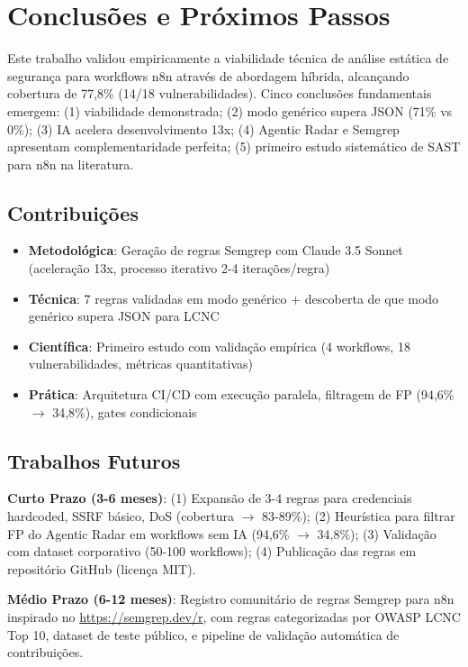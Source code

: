 \documentclass[12pt,a4paper]{article}
\begin{document}
\section{Conclusões e Próximos Passos}
\label{sec:conclusoes}

Este trabalho validou empiricamente a viabilidade técnica de análise estática de segurança para workflows n8n através de abordagem híbrida, alcançando cobertura de 77,8\% (14/18 vulnerabilidades). Cinco conclusões fundamentais emergem: (1) viabilidade demonstrada; (2) modo genérico supera JSON (71\% vs 0\%); (3) IA acelera desenvolvimento 13x; (4) Agentic Radar e Semgrep apresentam complementaridade perfeita; (5) primeiro estudo sistemático de SAST para n8n na literatura.

\subsection{Contribuições}

\begin{itemize}[noitemsep,topsep=0pt]
    \item \textbf{Metodológica}: Geração de regras Semgrep com Claude 3.5 Sonnet (aceleração 13x, processo iterativo 2-4 iterações/regra)
    \item \textbf{Técnica}: 7 regras validadas em modo genérico + descoberta de que modo genérico supera JSON para LCNC
    \item \textbf{Científica}: Primeiro estudo com validação empírica (4 workflows, 18 vulnerabilidades, métricas quantitativas)
    \item \textbf{Prática}: Arquitetura CI/CD com execução paralela, filtragem de FP (94,6\% $\rightarrow$ 34,8\%), gates condicionais
\end{itemize}

\subsection{Trabalhos Futuros}
\label{sec:trabalhos-futuros}

\textbf{Curto Prazo (3-6 meses)}: (1) Expansão de 3-4 regras para credenciais hardcoded, SSRF básico, DoS (cobertura $\rightarrow$ 83-89\%); (2) Heurística para filtrar FP do Agentic Radar em workflows sem IA (94,6\% $\rightarrow$ 34,8\%); (3) Validação com dataset corporativo (50-100 workflows); (4) Publicação das regras em repositório GitHub (licença MIT).

\textbf{Médio Prazo (6-12 meses)}: Registro comunitário de regras Semgrep para n8n inspirado no \url{https://semgrep.dev/r}, com regras categorizadas por OWASP LCNC Top 10, dataset de teste público, e pipeline de validação automática de contribuições.
\end{document}
